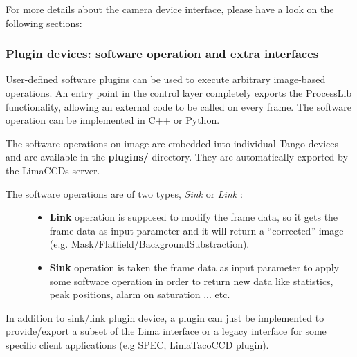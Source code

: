 \documentclass[letterpaper,10pt,english]{sphinxmanual}
\begin{document}
For more details about the camera device interface, please have a look on the following sections:


\subsubsection{Plugin devices: software operation and extra interfaces}
\label{LimaDetector/limadetector:plugin-devices-software-operation-and-extra-interfaces}
User-defined software plugins can be used to execute arbitrary image-based operations. An entry point in the control layer completely exports the ProcessLib functionality, allowing an external code to be called on every frame. The software operation can be implemented in C++ or Python.

The software operations on image are embedded into individual Tango devices and are available in the \textbf{plugins/} directory. They are automatically exported
by the LimaCCDs server.
\begin{description}
\item[{The software operations are of two types, \emph{Sink} or \emph{Link} :}] \leavevmode\begin{itemize}
\item {} 
\textbf{Link} operation is supposed to modify the frame data, so it gets the frame data as input parameter and it will return a ``corrected'' image (e.g. Mask/Flatfield/BackgroundSubstraction).

\item {} 
\textbf{Sink} operation  is taken the frame data as input parameter to apply some software operation in order to return new data like statistics, peak positions, alarm on saturation ... etc.

\end{itemize}

\end{description}

In addition to sink/link plugin device, a plugin can just be implemented to provide/export a subset of the Lima interface or a legacy interface for some specific client applications (e.g SPEC, LimaTacoCCD plugin).
\end{document}
